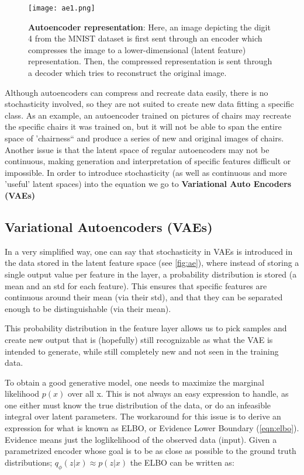 \begin{figure}[!htb]
 \centering
 \texttt{[image: ae1.png]}
 \caption{\textbf{Autoencoder representation}: Here, an image depicting the digit 4 from the MNIST dataset is first sent through an encoder which compresses the image to a lower-dimensional (latent feature) representation. Then, the compressed representation is sent through a decoder which tries to reconstruct the original image.}
 \label{fig:ae}
\end{figure}

Although autoencoders can compress and recreate data easily, there is no stochasticity involved, so they are not suited to create new data fitting a specific class. As an example, an autoencoder trained on pictures of chairs may recreate the specific chairs it was trained on, but it will not be able to span the entire space of 'chairness`` and produce a series of new and original images of chairs. Another issue is that the latent space of regular autoencoders may not be continuous, making generation and interpretation of specific features difficult or impossible.
In order to introduce stochasticity (as well as continuous and more 'useful' latent spaces) into the equation we go to \textbf{Variational Auto Encoders (VAEs)}

\subsection{Variational Autoencoders (VAEs)}
In a very simplified way, one can say that stochasticity in VAEs is introduced in the data stored in the latent feature space (see \autoref{fig:ae}), where instead of storing a single output value per feature in the layer, a probability distribution is stored (a mean and an std for each feature). This ensures that specific features are continuous around their mean (via their std), and that they can be separated enough to be distinguishable (via their mean).

This probability distribution in the feature layer allows us to pick samples and create new output that is (hopefully) still recognizable as what the VAE is intended to generate, while still completely new and not seen in the training data. 

To obtain a good generative model, one needs to maximize the marginal likelihood $p(x)$ over all x. This is not always an easy expression to handle, as one either must know the true distribution of the data, or do an infeasible integral over latent parameters. The workaround for this issue is to derive an expression for what is known as ELBO, or Evidence Lower Boundary (\autoref{eqn:elbo}). Evidence means just the loglikelihood of the observed data (input).
Given a parametrized encoder whose goal is to be as close as possible to the ground truth distributions; $q_\phi(z|x)\approx p(z|x)$ the ELBO can be written as:

